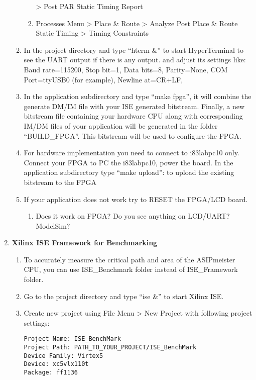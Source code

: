 \begin{enumerate}
\begin{enumerate}
\begin{enumerate}
		\textgreater{} Post PAR Static Timing Report
		\item
		Processes Menu \textgreater{} Place \& Route \textgreater{} Analyze
		Post Place \& Route Static Timing \textgreater{} Timing Constraints
	\end{enumerate}
	\item
	In the project directory and type ``hterm \&'' to start HyperTerminal
	to see the UART output if there is any output. and adjust its settings
	like: Baud rate=115200, Stop bit=1, Data bits=8, Parity=None, COM
	Port=ttyUSB0 (for example), Newline at=CR+LF,
	\item
	In the application subdirectory and type ``make fpga'', it will
	combine the generate DM/IM file with your ISE generated bitstream.
	Finally, a new bitstream file containing your hardware CPU along with
	corresponding IM/DM files of your application will be generated in the
	folder ``BUILD\_FPGA''. This bitstream will be used to configure the
	FPGA.
	\item
	For hardware implementation you need to connect to i83labpc10 only.
	Connect your FPGA to PC the i83labpc10, power the board. In the
	application subdirectory type ``make upload'': to upload the existing
	bitstream to the FPGA
	\item
	\color{blue}If your application does not work try to RESET the FPGA/LCD board.\normalcolor
	\begin{enumerate}[label=(\alph*),start=2]
		\color{red}\item\normalcolor
		Does it work on FPGA? Do you see anything on LCD/UART?
		ModelSim?
	\end{enumerate}
\end{enumerate}
\item \textbf{Xilinx ISE Framework for Benchmarking}
	\begin{enumerate}
		\item
		To accurately measure the critical path and area of the ASIPmeister
		CPU, you can use ISE\_Benchmark folder instead of ISE\_Framework
		folder.
		\item
		Go to the project directory and type ``ise \&'' to start Xilinx ISE.
		\item
		Create new project using File Menu \textgreater{} New Project with
		following project settings:
	\begin{lstlisting}
Project Name: ISE_BenchMark
Project Path: PATH_TO_YOUR_PROJECT/ISE_BenchMark
Device Family: Virtex5
Device: xc5vlx110t
Package: ff1136
	\end{lstlisting}

\end{enumerate}
\end{enumerate}

